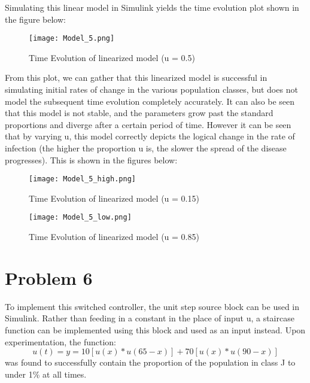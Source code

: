 \documentclass[letterpaper,twocolumn,10pt]{article}
\begin{document}
\vspace{3mm}
\linebreak
Simulating this linear model in Simulink yields the time evolution plot shown in the figure below:
\begin{figure}[htb!]
\centering
\texttt{[image: Model\_5.png]}
\caption{Time Evolution of linearized model (u = 0.5) \label{fig:Model_5}}
\end{figure}

From this plot, we can gather that this linearized model is successful in simulating initial rates of change in the various population classes, but does not model the subsequent time evolution completely accurately. It can also be seen that this model is not stable, and the parameters grow past the standard proportions and diverge after a certain period of time.\hspace*{\fill}
\vspace{2mm}
\linebreak
However it can be seen that by varying u, this model correctly depicts the logical change in the rate of infection (the higher the proportion u is, the slower the spread of the disease progresses). This is shown in the figures below:

\begin{figure}[htb!]
\centering
\texttt{[image: Model\_5\_high.png]}
\caption{Time Evolution of linearized model (u = 0.15) \label{fig:Model_5}}
\end{figure}

\begin{figure}[htb!]
\centering
\texttt{[image: Model\_5\_low.png]}
\caption{Time Evolution of linearized model (u = 0.85) \label{fig:Model_5}}
\end{figure}

\section*{Problem 6}
To implement this switched controller, the unit step source block can be used in Simulink. Rather than feeding in a constant in the place of input u, a staircase function can be implemented using this block and used as an input instead.\hspace*{\fill}
\vspace{2mm}
\linebreak
Upon experimentation, the function:
\[u(t) = y=10[u(x)*u(65-x)]+70[u(x)*u(90-x)]\]
was found to successfully contain the proportion of the population in class J to under 1\% at all times.\hspace*{\fill}
\linebreak
\end{document}

